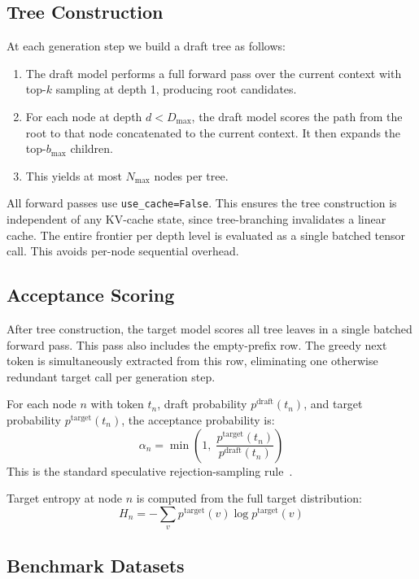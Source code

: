 \documentclass[conference]{IEEEtran}
\begin{document}
\subsection{Tree Construction}
At each generation step we build a draft tree as follows:
\begin{enumerate}
  \item The draft model performs a full forward pass over the current context
        with top-$k$ sampling at depth 1, producing root candidates.
  \item For each node at depth $d < D_{\max}$, the draft model scores the path from the root to that node concatenated to the current context. It then expands the top-$b_{\max}$ children.
  \item This yields at most $N_{\max}$ nodes per tree.
\end{enumerate}

All forward passes use \texttt{use\_cache=False}. This ensures the tree construction is independent of any KV-cache state, since tree-branching invalidates a linear cache. The entire frontier per depth level is evaluated as a single batched tensor call. This avoids per-node sequential overhead.

\subsection{Acceptance Scoring}
After tree construction, the target model scores all tree leaves in a single batched forward pass. This pass also includes the empty-prefix row. The greedy next token is simultaneously extracted from this row, eliminating one otherwise redundant target call per generation step.

For each node $n$ with token $t_n$, draft probability $p^{\text{draft}}(t_n)$,
and target probability $p^{\text{target}}(t_n)$, the acceptance probability is:
\begin{equation}
  \alpha_n = \min\!\left(1,\; \frac{p^{\text{target}}(t_n)}{p^{\text{draft}}(t_n)}\right)
  \label{eq:alpha}
\end{equation}
This is the standard speculative rejection-sampling rule~\cite{leviathan2023}.

Target entropy at node $n$ is computed from the full target distribution:
\begin{equation}
  H_n = -\sum_v p^{\text{target}}(v)\log p^{\text{target}}(v)
\end{equation}

\subsection{Benchmark Datasets}
\end{document}
